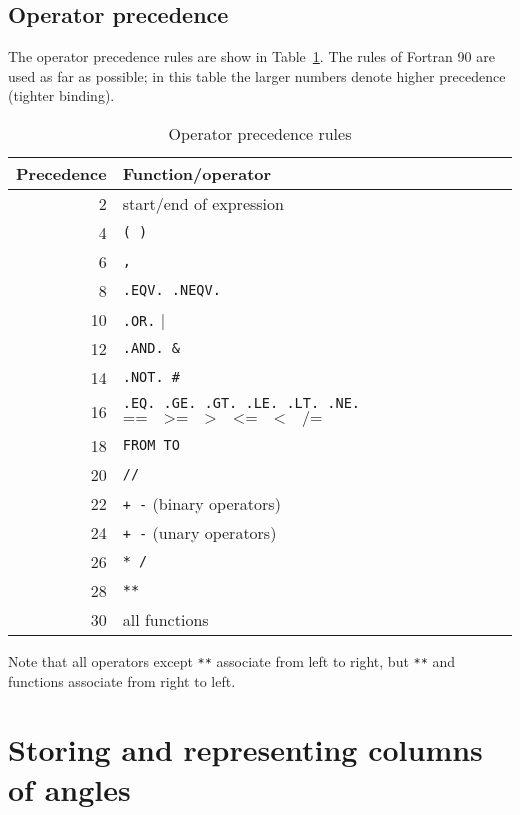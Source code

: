 \documentclass[twoside,11pt]{starlink}
\begin{document}
\subsection{Operator precedence}

The operator precedence rules are show in Table~\ref{PREC}. The rules
of Fortran 90 are used as far as possible; in this table the larger
numbers denote higher precedence (tighter binding).

\begin{table}[htbp]

\begin{center}
\begin{tabular}{rl}
Precedence  & Function/operator  \\ \hline
  2 & start/end of expression  \\
  4 & \texttt{(  )}  \\
  6 & \texttt{,}  \\
  8 & \texttt{.EQV.  .NEQV.}  \\
 10 & \texttt{.OR.}   $\texttt{|}$  \\
 12 & \texttt{.AND.  \&} \\
 14 & \texttt{.NOT.  \#}  \\
 16 & \texttt{.EQ. .GE. .GT. .LE. .LT. .NE.} $\texttt{== ~ >= ~ > ~ <= ~ < ~ /=}$ \\
 18 & \texttt{FROM  TO}  \\
 20 & \texttt{//}  \\
 22 & \texttt{+ -} (binary operators)  \\
 24 & \texttt{+ -} (unary operators)  \\
 26 & \texttt{* /}  \\
 28 & \texttt{**}  \\
 30 & all functions  \\
\end{tabular}
\end{center}

\caption{Operator precedence rules\label{PREC} }

\end{table}

Note that all operators except \texttt{**} associate from left to right, but
\texttt{**} and functions associate from right to left.


\section{\label{ANGLE}Storing and representing columns of angles}
\end{document}
